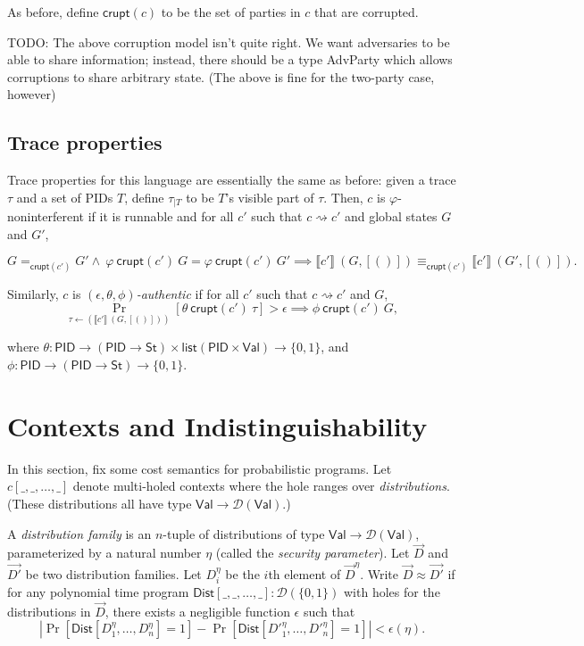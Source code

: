 \documentclass{article}
\newcommand{\Val}{\mathsf{Val}}
\newcommand{\St}{\mathsf{St}}
\newcommand{\PID}{\mathsf{PID}}
\newcommand{\List}{\mathsf{list}}
\newcommand{\D}{\mathcal{D}}
\begin{document}
As before, define $\mathsf{crupt}(c)$ to be the set of parties in $c$ that are corrupted.

TODO: The above corruption model isn't quite right. We want adversaries to be able to share information; instead, there should be a type \textsf{AdvParty} which allows corruptions to share arbitrary state. (The above is fine for the two-party case, however)

\subsection{Trace properties}

Trace properties for this language are essentially the same as before: given a trace $\tau$ and a set of PIDs $T$, define $\tau_{| T}$ to be $T$'s visible part of $\tau$. Then, $c$ is $\varphi$-noninterferent if it is runnable and for all $c'$ such that $c \rightsquigarrow c'$ and global states $G$ and $G'$,

\[ G=_{\mathsf{crupt}(c')}G' \wedge\ \varphi\ \mathsf{crupt}(c')\ G = \varphi\ \mathsf{crupt}(c')\ G' \implies \llbracket c' \rrbracket\ (G, [()]) \equiv_{\mathsf{crupt}(c')} \llbracket c' \rrbracket\ (G', [()]).\]

Similarly, $c$ is \emph{$(\epsilon, \theta, \phi)$-authentic} if for all $c'$ such that $c \rightsquigarrow c'$ and $G$,
\[ \Pr_{\tau \leftarrow (\llbracket c' \rrbracket\ (G, [()]))}[\theta\ \mathsf{crupt}(c')\ \tau] > \epsilon \implies \phi\ \mathsf{crupt}(c')\ G,\]

where $\theta : \PID \to (\PID \to \St) \times \List (\PID \times \Val) \to \{0,1\}$, and $\phi : \PID \to (\PID \to \St) \to \{0,1\}$.

\section{Contexts and Indistinguishability}


In this section, fix some cost semantics for probabilistic programs.
Let $c[\_, \_, \dots, \_]$ denote multi-holed contexts where the hole ranges over \emph{distributions}. (These distributions all have type $\Val \to \D(\Val)$.)

A \emph{distribution family} is an $n$-tuple of distributions of type $\Val \to \D(\Val)$, parameterized by a natural number $\eta$ (called the \emph{security parameter}). Let $\vec{D}$ and $\vec{D'}$ be two distribution families. Let $D_i^\eta$ be the $i$th element of $\vec{D}^\eta$. Write $\vec{D} \approx \vec{D'}$ if for any polynomial time program $\mathsf{Dist}[\_, \_, \dots, \_] : \D(\{0,1\})$ with holes for the distributions in $\vec{D}$, there exists a negligible function $\epsilon$ such that
\[|\Pr[\mathsf{Dist}[D_1^\eta, \dots, D_n^\eta] = 1] - \Pr[\mathsf{Dist}[D'^\eta_1, \dots, D'^\eta_n] = 1]| < \epsilon(\eta).\]
\end{document}
